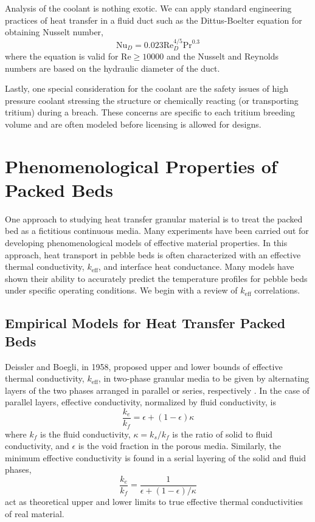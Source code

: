 \documentclass[11pt]{report} %
\begin{document}
Analysis of the coolant is nothing exotic. We can apply standard engineering practices of heat transfer in a fluid duct such as the Dittus-Boelter equation for obtaining Nusselt number,
\begin{equation}
\text{Nu}_D = 0.023 \text{Re}_D^{4/5}\text{Pr}^{0.3}
\end{equation}
where the equation is valid for Re$\ge 10000$ and the Nusselt and Reynolds numbers are based on the hydraulic diameter of the duct.

Lastly, one special consideration for the coolant are the safety issues of high pressure coolant stressing the structure or chemically reacting (or transporting tritium) during a breach. These concerns are specific to each tritium breeding volume and are often modeled before licensing is allowed for designs.


\section{Phenomenological Properties of Packed Beds}
One approach to studying heat transfer granular material is to treat the packed bed as a fictitious continuous media. Many experiments have been carried out for developing phenomenological models of effective material properties. In this approach, heat transport in pebble beds is often characterized with an effective thermal conductivity, $k_\text{eff}$, and interface heat conductance. Many models have shown their ability to accurately predict the temperature profiles for pebble beds under specific operating conditions. We begin with a review of $k_\text{eff}$ correlations.

\subsection{Empirical Models for Heat Transfer Packed Beds}
Deissler and Boegli, in 1958, proposed upper and lower bounds of effective thermal conductivity, $k_\text{eff}$, in two-phase granular media to be given by alternating layers of the two phases arranged in parallel or series, respectively \cite{Deissler1958}. In the case of parallel layers, effective conductivity, normalized by fluid conductivity, is
\begin{equation}\label{eq:keff-parallel}
	\frac{k_e}{k_f} = \epsilon + (1-\epsilon)\kappa
\end{equation}
where $k_f$ is the fluid conductivity, $\kappa = k_s/k_f$ is the ratio of solid to fluid conductivity, and $\epsilon$ is the void fraction in the porous media. Similarly, the minimum effective conductivity is found in a serial layering of the solid and fluid phases,
\begin{equation}\label{eq:keff-series}
	\frac{k_e}{k_f} = \frac{1}{\epsilon + (1-\epsilon)/\kappa}
\end{equation}
 act as theoretical upper and lower limits to true effective thermal conductivities of real material.
\end{document}
